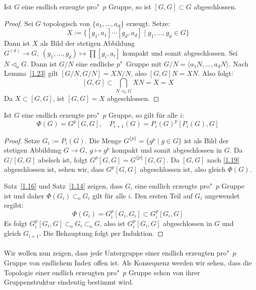 \documentclass[11pt,a4paper,openany]{memoir}
\begin{document}
\begin{proposition}\label{1.19}
Ist $G$ eine endlich erzeugte pro"~$p$ Gruppe, so ist $[G,G]\subset G$ abgeschlossen.
\end{proposition}

\begin{proof}
Sei $G$ topologisch von $\{a_1,\ldots,a_d\}$ erzeugt. Setze:
\[X:=\{[g_1,a_1]\cdots[g_d,a_d]\mid g_1,\ldots,g_d\in G \} \]
Dann ist $X$ als Bild der stetigen Abbildung $G^{(d)}\to G,\ (g_1,\ldots,g_d)\mapsto \prod [g_i,a_i]$ kompakt und somit abgeschlossen. Sei $N\lhd_\text{o}G$. Dann ist $G/N$ eine endliche $p$"~Gruppe mit $G/N=\langle a_1N,\ldots,a_dN\rangle$. Nach Lemma~\ref{1.23} gilt $[G/N,G/N]=XN/N$, also $[G,G]N=XN$. Also folgt:
\[[G,G]\subset\bigcap_{N\lhd_\text{o}G}XN=\overline{X}=X \]
Da $X\subset [G,G]$, ist $[G,G]=X$ abgeschlossen.
\end{proof}

\begin{corollary}\label{1.20}
Ist $G$ eine endlich erzeugte pro"~$p$ Gruppe, so gilt für alle $i$:
\[\Phi(G)=G^p[G,G],\quad P_{i+1}(G)=P_i(G)^p[P_i(G),G] \]
\end{corollary}

\begin{proof}
Setze $G_i:=P_i(G)$. Die Menge $G^{\{p\}}=\{g^p\mid g\in G\}$ ist als Bild der stetigen Abbildung $G\to G,\ g\mapsto g^p$ kompakt und somit abgeschlossen in $G$. Da $G/[G,G]$ abelsch ist, folgt $G^p[G,G]=G^{\{p\}}[G,G]$. Da $[G,G]$ nach \ref{1.19} abgeschlossen ist, sehen wir, dass $G^p[G,G]$ abgeschlossen ist, also gleich $\Phi(G)$. 

Satz~\ref{1.16} und Satz~\ref{1.14} zeigen, dass $G_i$ eine endlich erzeugte pro"~$p$ Gruppe ist und daher $\Phi(G_i)\subset_\text{o}G_i$ gilt für alle $i$. Den ersten Teil auf $G_i$ angewendet ergibt:
\[\Phi(G_i)=G_i^p[G_i,G_i]\subset G_i^p [G_i,G]\]
Es folgt $G_i^p[G_i,G]\subset_\text{o}G_i\subset_\text{o}G$, also ist $G_i^p[G_i,G]$ abgeschlossen in $G$ und gleich $G_{i+1}$. Die Behauptung folgt per Induktion.
\end{proof}

\paragraph{} Wir wollen nun zeigen, dass jede Untergruppe einer endlich erzeugten pro"~$p$ Gruppe von endlichem Index offen ist. Als Konsequenz werden wir sehen, dass die Topologie einer endlich erzeugten pro"~$p$ Gruppe schon von ihrer Gruppenstruktur eindeutig bestimmt wird.
\end{document}
